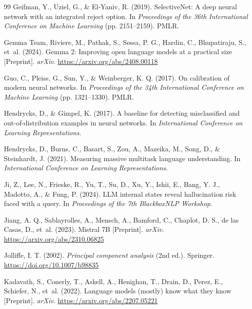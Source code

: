 \documentclass[preprint,12pt,authoryear]{elsarticle}
\begin{document}
\begin{thebibliography}{99}
Geifman, Y., Uziel, G., \& El-Yaniv, R. (2019). SelectiveNet: A deep neural network with an integrated reject option. In \emph{Proceedings of the 36th International Conference on Machine Learning} (pp. 2151--2159). PMLR.

Gemma Team, Riviere, M., Pathak, S., Sessa, P. G., Hardin, C., Bhupatiraju, S., et~al. (2024). Gemma 2: Improving open language models at a practical size [Preprint]. \emph{arXiv}. \url{https://arxiv.org/abs/2408.00118}

Guo, C., Pleiss, G., Sun, Y., \& Weinberger, K. Q. (2017). On calibration of modern neural networks. In \emph{Proceedings of the 34th International Conference on Machine Learning} (pp. 1321--1330). PMLR.

Hendrycks, D., \& Gimpel, K. (2017). A baseline for detecting misclassified and out-of-distribution examples in neural networks. In \emph{International Conference on Learning Representations}.

Hendrycks, D., Burns, C., Basart, S., Zou, A., Mazeika, M., Song, D., \& Steinhardt, J. (2021). Measuring massive multitask language understanding. In \emph{International Conference on Learning Representations}.

Ji, Z., Lee, N., Frieske, R., Yu, T., Su, D., Xu, Y., Ishii, E., Bang, Y. J., Madotto, A., \& Fung, P. (2024). LLM internal states reveal hallucination risk faced with a query. In \emph{Proceedings of the 7th BlackboxNLP Workshop}.

Jiang, A. Q., Sablayrolles, A., Mensch, A., Bamford, C., Chaplot, D. S., de las Casas, D., et~al. (2023). Mistral 7B [Preprint]. \emph{arXiv}. \url{https://arxiv.org/abs/2310.06825}

Jolliffe, I. T. (2002). \emph{Principal component analysis} (2nd ed.). Springer. \url{https://doi.org/10.1007/b98835}

Kadavath, S., Conerly, T., Askell, A., Henighan, T., Drain, D., Perez, E., Schiefer, N., et~al. (2022). Language models (mostly) know what they know [Preprint]. \emph{arXiv}. \url{https://arxiv.org/abs/2207.05221}


\end{thebibliography}
\end{document}
